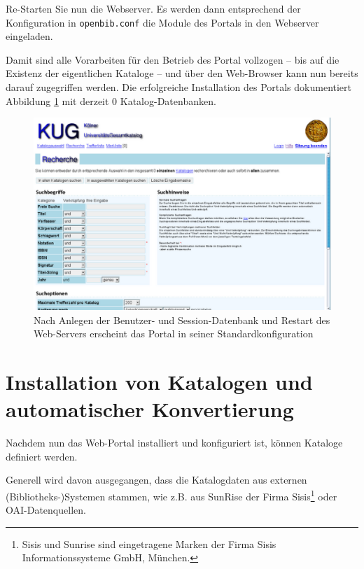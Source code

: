 \documentclass[11pt, twoside, a4paper, BCOR8mm, DIV12, bibtotoc,idxtotoc]{scrbook}
\begin{document}
Re-Starten Sie nun die Webserver. Es werden dann entsprechend der
Konfiguration in \texttt{openbib.conf} die Module des Portals in den
Webserver eingeladen.

Damit sind alle Vorarbeiten für den Betrieb des Portal vollzogen --
bis auf die Existenz der eigentlichen Kataloge -- und über den
Web-Browser kann nun bereits darauf zugegriffen werden. Die
erfolgreiche Installation des Portals dokumentiert Abbildung
\ref{bild:fertig} mit derzeit 0 Katalog-Datenbanken.

\begin{figure}
\begin{shadowenv}
  \vspace{4mm}
    \centering \begin{minipage}[b]{1.0\textwidth}
      \centering \includegraphics[width=14cm]{fertig1.eps}
    \end{minipage}
    \caption{Nach Anlegen der Benutzer- und Session-Datenbank und
      Restart des Web-Servers erscheint das Portal in seiner Standardkonfiguration}
  \label{bild:fertig}
  \vspace{3mm}
\end{shadowenv}
\end{figure}


\chapter{Installation von Katalogen und automatischer Konvertierung}

Nachdem nun das Web-Portal installiert und konfiguriert ist, können
Kataloge definiert werden.

Generell wird davon ausgegangen, dass die Katalogdaten aus externen
(Bibliotheks-)Systemen stammen, wie z.B. aus SunRise der Firma
Sisis\footnote{Sisis und Sunrise sind eingetragene Marken der Firma
  Sisis Informationssysteme GmbH, München.} oder OAI-Datenquellen.
\end{document}
